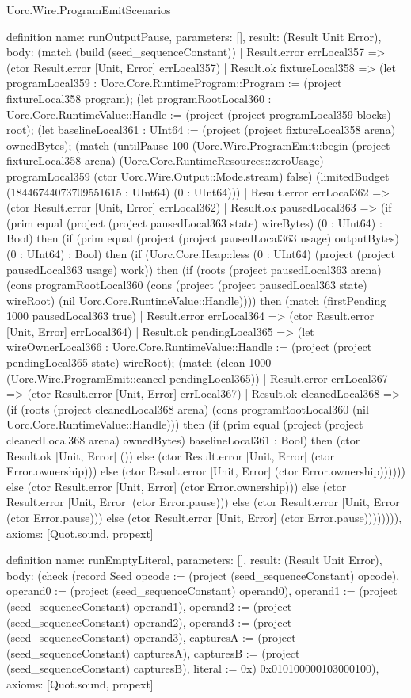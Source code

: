 \begin{lexlean}{Uorc.Wire.ProgramEmitScenarios}
\begin{semanticmodule}
definition{
  name: runOutputPause,
  parameters: [],
  result: (Result Unit Error),
  body: (match (build (seed_sequenceConstant))
    | Result.error errLocal357 => (ctor Result.error [Unit, Error] errLocal357)
    | Result.ok fixtureLocal358 => (let programLocal359 : Uorc.Core.RuntimeProgram::Program := (project fixtureLocal358 program); (let programRootLocal360 : Uorc.Core.RuntimeValue::Handle := (project (project programLocal359 blocks) root); (let baselineLocal361 : UInt64 := (project (project fixtureLocal358 arena) ownedBytes); (match (untilPause 100 (Uorc.Wire.ProgramEmit::begin (project fixtureLocal358 arena) (Uorc.Core.RuntimeResources::zeroUsage) programLocal359 (ctor Uorc.Wire.Output::Mode.stream) false) (limitedBudget (18446744073709551615 : UInt64) (0 : UInt64)))
      | Result.error errLocal362 => (ctor Result.error [Unit, Error] errLocal362)
      | Result.ok pausedLocal363 => (if (prim equal (project (project pausedLocal363 state) wireBytes) (0 : UInt64) : Bool) then (if (prim equal (project (project pausedLocal363 usage) outputBytes) (0 : UInt64) : Bool) then (if (Uorc.Core.Heap::less (0 : UInt64) (project (project pausedLocal363 usage) work)) then (if (roots (project pausedLocal363 arena) (cons programRootLocal360 (cons (project (project pausedLocal363 state) wireRoot) (nil Uorc.Core.RuntimeValue::Handle)))) then (match (firstPending 1000 pausedLocal363 true)
        | Result.error errLocal364 => (ctor Result.error [Unit, Error] errLocal364)
        | Result.ok pendingLocal365 => (let wireOwnerLocal366 : Uorc.Core.RuntimeValue::Handle := (project (project pendingLocal365 state) wireRoot); (match (clean 1000 (Uorc.Wire.ProgramEmit::cancel pendingLocal365))
          | Result.error errLocal367 => (ctor Result.error [Unit, Error] errLocal367)
          | Result.ok cleanedLocal368 => (if (roots (project cleanedLocal368 arena) (cons programRootLocal360 (nil Uorc.Core.RuntimeValue::Handle))) then (if (prim equal (project (project cleanedLocal368 arena) ownedBytes) baselineLocal361 : Bool) then (ctor Result.ok [Unit, Error] ()) else (ctor Result.error [Unit, Error] (ctor Error.ownership))) else (ctor Result.error [Unit, Error] (ctor Error.ownership)))))) else (ctor Result.error [Unit, Error] (ctor Error.ownership))) else (ctor Result.error [Unit, Error] (ctor Error.pause))) else (ctor Result.error [Unit, Error] (ctor Error.pause))) else (ctor Result.error [Unit, Error] (ctor Error.pause)))))))),
  axioms: [Quot.sound, propext]
}

definition{
  name: runEmptyLiteral,
  parameters: [],
  result: (Result Unit Error),
  body: (check (record Seed {opcode := (project (seed_sequenceConstant) opcode), operand0 := (project (seed_sequenceConstant) operand0), operand1 := (project (seed_sequenceConstant) operand1), operand2 := (project (seed_sequenceConstant) operand2), operand3 := (project (seed_sequenceConstant) operand3), capturesA := (project (seed_sequenceConstant) capturesA), capturesB := (project (seed_sequenceConstant) capturesB), literal := 0x}) 0x010100000103000100),
  axioms: [Quot.sound, propext]
}


\end{semanticmodule}
\end{lexlean}
